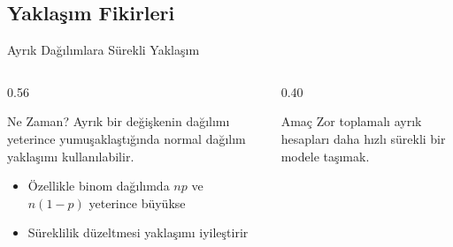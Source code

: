 \documentclass[light]{lutbeamer}
\begin{document}
\subsection{Yaklaşım Fikirleri}

\begin{frame}{Ayrık Dağılımlara Sürekli Yaklaşım}
\small
\begin{columns}[T,onlytextwidth]
    \begin{column}{0.56\textwidth}
        \begin{block}{Ne Zaman?}
            Ayrık bir değişkenin dağılımı yeterince yumuşaklaştığında normal dağılım yaklaşımı kullanılabilir.
        \end{block}

        \begin{itemize}
            \item Özellikle binom dağılımda $np$ ve $n(1-p)$ yeterince büyükse
            \item Süreklilik düzeltmesi yaklaşımı iyileştirir
        \end{itemize}
    \end{column}
    \begin{column}{0.40\textwidth}
        \begin{alertblock}{Amaç}
            Zor toplamalı ayrık hesapları daha hızlı sürekli bir modele taşımak.
        \end{alertblock}
    \end{column}
\end{columns}
\end{frame}
\end{document}
